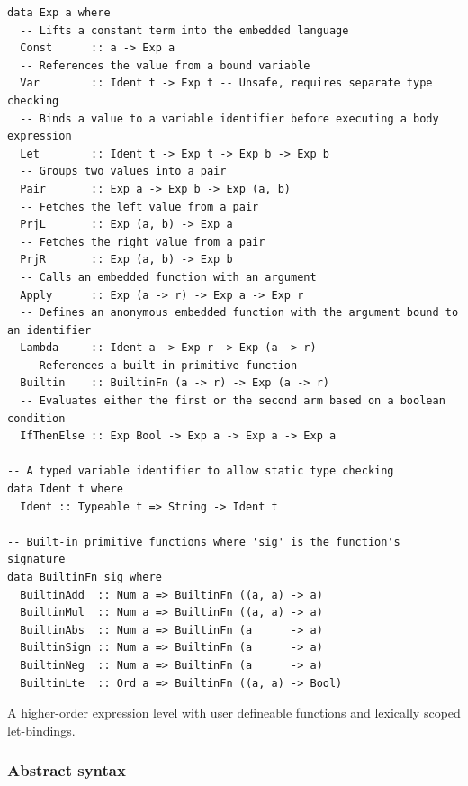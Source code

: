 \documentclass[fontsize=11pt,a4paper,parskip=half,numbers=noenddot]{scrartcl}
\begin{document}
\begin{listing}[!t]
\begin{verbatim}
data Exp a where
  -- Lifts a constant term into the embedded language
  Const      :: a -> Exp a
  -- References the value from a bound variable
  Var        :: Ident t -> Exp t -- Unsafe, requires separate type checking
  -- Binds a value to a variable identifier before executing a body expression
  Let        :: Ident t -> Exp t -> Exp b -> Exp b
  -- Groups two values into a pair
  Pair       :: Exp a -> Exp b -> Exp (a, b)
  -- Fetches the left value from a pair
  PrjL       :: Exp (a, b) -> Exp a
  -- Fetches the right value from a pair
  PrjR       :: Exp (a, b) -> Exp b
  -- Calls an embedded function with an argument
  Apply      :: Exp (a -> r) -> Exp a -> Exp r
  -- Defines an anonymous embedded function with the argument bound to an identifier
  Lambda     :: Ident a -> Exp r -> Exp (a -> r)
  -- References a built-in primitive function
  Builtin    :: BuiltinFn (a -> r) -> Exp (a -> r)
  -- Evaluates either the first or the second arm based on a boolean condition
  IfThenElse :: Exp Bool -> Exp a -> Exp a -> Exp a

-- A typed variable identifier to allow static type checking
data Ident t where
  Ident :: Typeable t => String -> Ident t

-- Built-in primitive functions where 'sig' is the function's signature
data BuiltinFn sig where
  BuiltinAdd  :: Num a => BuiltinFn ((a, a) -> a)
  BuiltinMul  :: Num a => BuiltinFn ((a, a) -> a)
  BuiltinAbs  :: Num a => BuiltinFn (a      -> a)
  BuiltinSign :: Num a => BuiltinFn (a      -> a)
  BuiltinNeg  :: Num a => BuiltinFn (a      -> a)
  BuiltinLte  :: Ord a => BuiltinFn ((a, a) -> Bool)
\end{verbatim}
\caption{A higher-order expression level with user defineable functions and lexically scoped let-bindings.}\label{src:base-ast}
\end{listing}

\subsubsection{Abstract syntax}\label{sec:language-ast}

\end{document}
